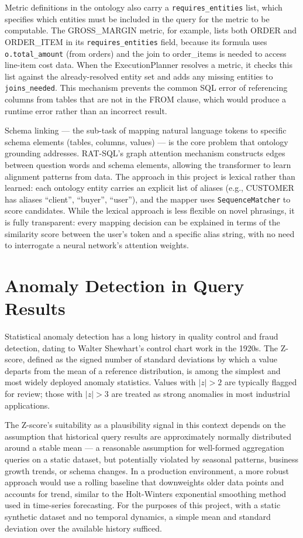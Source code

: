 \documentclass[12pt,a4paper]{report}
\begin{document}
Metric definitions in the ontology also carry a \texttt{requires\_entities} list, which specifies which entities must be included in the query for the metric to be computable. The GROSS\_MARGIN metric, for example, lists both ORDER and ORDER\_ITEM in its \texttt{requires\_entities} field, because its formula uses \texttt{o.total\_amount} (from orders) and the join to order\_items is needed to access line-item cost data. When the ExecutionPlanner resolves a metric, it checks this list against the already-resolved entity set and adds any missing entities to \texttt{joins\_needed}. This mechanism prevents the common SQL error of referencing columns from tables that are not in the FROM clause, which would produce a runtime error rather than an incorrect result.

Schema linking — the sub-task of mapping natural language tokens to specific schema elements (tables, columns, values) — is the core problem that ontology grounding addresses. RAT-SQL's graph attention mechanism constructs edges between question words and schema elements, allowing the transformer to learn alignment patterns from data. The approach in this project is lexical rather than learned: each ontology entity carries an explicit list of aliases (e.g., CUSTOMER has aliases ``client'', ``buyer'', ``user''), and the mapper uses \texttt{SequenceMatcher} to score candidates. While the lexical approach is less flexible on novel phrasings, it is fully transparent: every mapping decision can be explained in terms of the similarity score between the user's token and a specific alias string, with no need to interrogate a neural network's attention weights.

\section{Anomaly Detection in Query Results}
\label{sec:anomaly-detection}

Statistical anomaly detection has a long history in quality control and fraud detection, dating to Walter Shewhart's control chart work in the 1920s. The Z-score, defined as the signed number of standard deviations by which a value departs from the mean of a reference distribution, is among the simplest and most widely deployed anomaly statistics. Values with $|z| > 2$ are typically flagged for review; those with $|z| > 3$ are treated as strong anomalies in most industrial applications.

The Z-score's suitability as a plausibility signal in this context depends on the assumption that historical query results are approximately normally distributed around a stable mean — a reasonable assumption for well-formed aggregation queries on a static dataset, but potentially violated by seasonal patterns, business growth trends, or schema changes. In a production environment, a more robust approach would use a rolling baseline that downweights older data points and accounts for trend, similar to the Holt-Winters exponential smoothing method used in time-series forecasting. For the purposes of this project, with a static synthetic dataset and no temporal dynamics, a simple mean and standard deviation over the available history sufficed.
\end{document}
